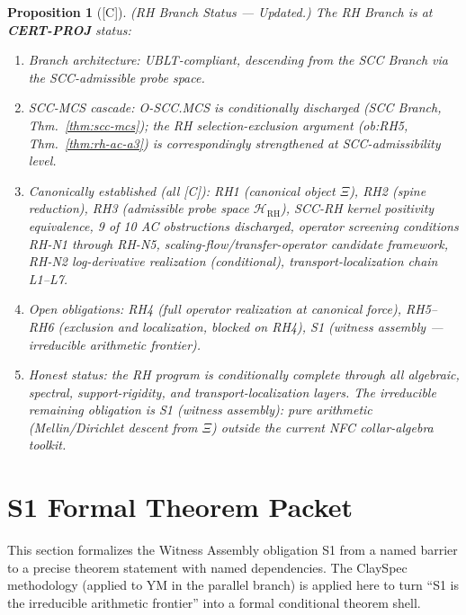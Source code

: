 \documentclass[12pt,oneside]{amsbook}
\theoremstyle{plain}
\newtheorem{proposition}[theorem]{Proposition}
\theoremstyle{definition}
\theoremstyle{remark}
\newcommand{\status}[1]{\textup{[#1]}}
\begin{document}
\begin{proposition}[\status{C}]\label{prop:RH-status}
\textup{(RH Branch Status --- Updated.)}
The RH Branch is at \textbf{CERT-PROJ} status:
\begin{enumerate}[label=\textup{(\roman*)}]
 \item \emph{Branch architecture}: UBLT-compliant, descending from
 the SCC Branch via the SCC-admissible probe space.
 \item \emph{SCC-MCS cascade}: O-SCC.MCS is conditionally discharged
 (SCC Branch, Thm.~\ref{thm:scc-mcs}); the RH selection-exclusion
 argument (ob:RH5, Thm.~\ref{thm:rh-ac-a3}) is correspondingly
 strengthened at SCC-admissibility level.
 \item \emph{Canonically established} (all [C]):
 RH1 (canonical object $\Xi$), RH2 (spine reduction),
 RH3 (admissible probe space $\mathcal{H}_{\mathrm{RH}}$),
 SCC-RH kernel positivity equivalence,
 9 of 10 AC obstructions discharged,
 operator screening conditions RH-N1 through RH-N5,
 scaling-flow/transfer-operator candidate framework,
 RH-N2 log-derivative realization (conditional),
 transport-localization chain L1--L7.
 \item \emph{Open obligations}: RH4 (full operator realization at
 canonical force), RH5--RH6 (exclusion and localization, blocked
 on RH4), S1 (witness assembly --- irreducible arithmetic frontier).
 \item \emph{Honest status}: the RH program is conditionally
 complete through all algebraic, spectral, support-rigidity, and
 transport-localization layers. The irreducible remaining obligation
 is S1 (witness assembly): pure arithmetic (Mellin/Dirichlet descent
 from $\Xi$) outside the current NFC collar-algebra toolkit.
\end{enumerate}
\end{proposition}

\section{S1 Formal Theorem Packet}
\label{sec:rh-s1-formal}

This section formalizes the Witness Assembly obligation S1 from a
named barrier to a precise theorem statement with named dependencies.
The ClaySpec methodology (applied to YM in the parallel branch) is
applied here to turn ``S1 is the irreducible arithmetic frontier''
into a formal conditional theorem shell.
\end{document}
